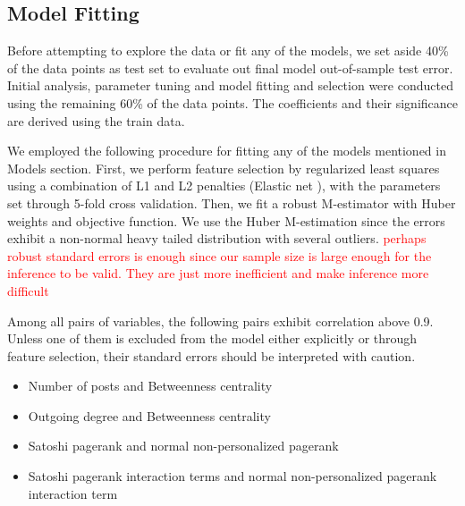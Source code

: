 \subsection{Model Fitting}
Before attempting to explore the data or fit any of the models, we set aside 40\% of the data points  as test set to evaluate out final model out-of-sample test error. Initial analysis, parameter tuning and model fitting and selection were conducted using the remaining 60\% of the data points. The coefficients and their significance are derived using the train data.

We employed the following procedure for fitting any of the models mentioned in Models section. First, we perform feature selection by regularized least squares using a combination of L1 and L2 penalties (Elastic net \cite{ElasticNet}), with the parameters set through 5-fold cross validation. Then, we fit a robust M-estimator with Huber weights and objective function. We use the Huber M-estimation since the errors exhibit a non-normal heavy tailed distribution with several outliers. \textcolor{red}{perhaps robust standard errors is enough since our sample size is large enough for the inference to be valid. They are just more inefficient and make inference more difficult}

Among all pairs of variables, the following pairs exhibit correlation above 0.9. Unless one of them is excluded from the model either explicitly or through feature selection, their standard errors should be interpreted with caution.
\begin{itemize} [topsep=0pt,itemsep=-0.5ex,partopsep=1ex,parsep=1ex]
 \item Number of posts and Betweenness centrality
 \item Outgoing degree and Betweenness centrality
 \item Satoshi pagerank and normal non-personalized pagerank
 \item Satoshi pagerank interaction terms and normal non-personalized pagerank interaction term
\end{itemize}





